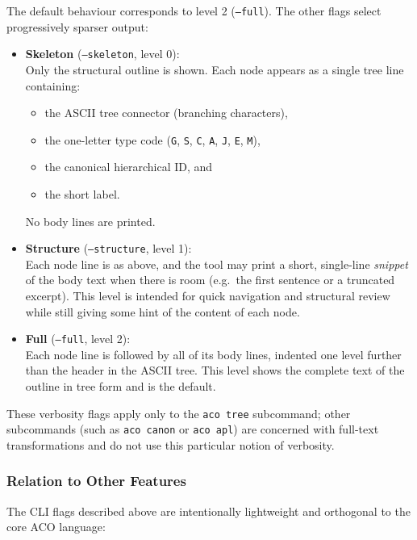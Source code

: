 \documentclass[11pt]{article}
\begin{document}
The default behaviour corresponds to level 2 (\texttt{--full}). The other flags select progressively sparser output:

\begin{itemize}[leftmargin=2em]
  \item \textbf{Skeleton} (\texttt{--skeleton}, level 0): \\
        Only the structural outline is shown. Each node appears as a single tree line containing:
        \begin{itemize}[leftmargin=1.5em]
          \item the ASCII tree connector (branching characters),
          \item the one-letter type code (\texttt{G}, \texttt{S}, \texttt{C}, \texttt{A}, \texttt{J}, \texttt{E}, \texttt{M}),
          \item the canonical hierarchical ID, and
          \item the short label.
        \end{itemize}
        No body lines are printed.

  \item \textbf{Structure} (\texttt{--structure}, level 1): \\
        Each node line is as above, and the tool may print a short, single-line \emph{snippet} of the body text when there is room (e.g.\ the first sentence or a truncated excerpt). This level is intended for quick navigation and structural review while still giving some hint of the content of each node.

  \item \textbf{Full} (\texttt{--full}, level 2): \\
        Each node line is followed by all of its body lines, indented one level further than the header in the ASCII tree. This level shows the complete text of the outline in tree form and is the default.
\end{itemize}

These verbosity flags apply only to the \texttt{aco tree} subcommand; other subcommands (such as \texttt{aco canon} or \texttt{aco apl}) are concerned with full-text transformations and do not use this particular notion of verbosity.

\subsubsection*{Relation to Other Features}

The CLI flags described above are intentionally lightweight and orthogonal to the core ACO language:
\end{document}
